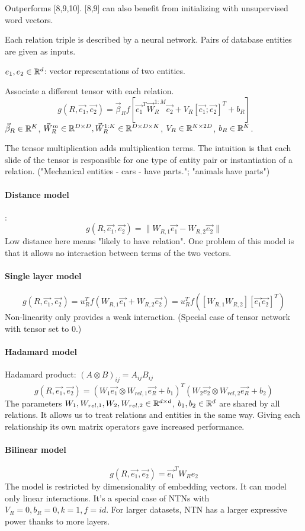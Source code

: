 Outperforms [8,9,10]. [8,9] can also benefit from initializing with unsupervised
word vectors.

Each relation triple is described by a neural network. Pairs of database
entities are given as inputs.

$e_1, e_2\in\mathbb{R}^d$: vector representations of two entities.

Associate a different tensor with each relation.
$$g(R,\vec{e_1},\vec{e_2}) = \vec{\beta}_R f[\vec{e_1}^T \vec{W}_R^{1:M}
\vec{e_2} + V_R [\vec{e_1};\vec{e_2}]^T + b_R]$$
$\vec{\beta}_R\in\mathbb{R}^K$, $\vec{W}_R^m\in\mathbb{R}^{D\times D}, \vec{W}^{1:K}_R\in\mathbb{R}^{D\times
D\times K}$, $V_R\in\mathbb{R}^{K\times 2D}$, $b_R\in\mathbb{R}^K$.

The tensor multiplication adds multiplication terms.
The intuition is that each slide of the tensor is responsible for one type of
entity pair or instantiation of a relation. ("Mechanical entities - cars - have
parts."; "animals have parts")

\paragraph{Distance model}: $$g(R,\vec{e_1},\vec{e_2})=\|W_{R,1} \vec{e_1} -
W_{R,2} \vec{e_2}\|$$
Low distance here means "likely to have relation". One problem of this model
is that it allows no interaction between terms of the two vectors.

\paragraph{Single layer model} $$g(R,\vec{e_1},\vec{e_2})=u_R^T
f(W_{R,1}\vec{e_1} + W_{R,2}\vec{e_2})=u_R^T f([W_{R,1}
W_{R,2}] [\vec{e_1} \vec{e_2}]^T)$$
Non-linearity only provides a weak interaction.
(Special case of tensor network with tensor set to 0.)

\paragraph{Hadamard model}
Hadamard product: $(A\otimes B)_{ij}=A_{ij}B_{ij}$
$$g(R,\vec{e_1},\vec{e_2})=(W_1 \vec{e_1}\otimes W_{rel,1}\vec{e_R}+b_1)^T (W_2
\vec{e_2}\otimes W_{rel,2}\vec{e_R}+b_2)$$
The parameters $W_1,W_{rel,1},W_2,W_{rel,2}\in\mathbb{R}^{d\times d}$, $b_1,b_2\in\mathbb{R}^d$
are shared by all relations. It allows us to treat relations and entities in the
same way. Giving each relationship its own matrix operators gave increased
performance.

\paragraph{Bilinear model}
$$g(R,\vec{e_1},\vec{e_2})=\vec{e_1}^T W_R e_2$$
The model is restricted by dimensionality of embedding vectors. It can model
only linear interactions. It's a special case of NTNs with
$V_R=0,b_R=0,k=1,f=id$. For larger datasets, NTN has a larger expressive power
thanks to more layers.

